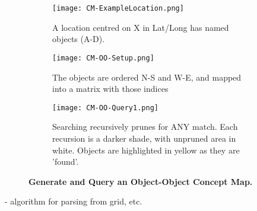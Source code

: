 \begin{figure*}[h]
    \centering
    
    \begin{subfigure}[t]{.3\textwidth}
        \texttt{[image: CM-ExampleLocation.png]}
        \caption{\small A location centred on X in Lat/Long has named objects (A-D).} %
        \label{fig:CM-Example}
    \end{subfigure}
    \hfill
    \begin{subfigure}[t]{.3\textwidth}
        \texttt{[image: CM-OO-Setup.png]}
        \caption{\small The objects are ordered N-S and W-E, and mapped into a matrix with those indices} %
        \label{fig:CM-OO-Setup}
    \end{subfigure}
    \hfill
        \begin{subfigure}[t]{.3\textwidth}
        \texttt{[image: CM-OO-Query1.png]}
        \caption{\small Searching recursively prunes for ANY match. Each recursion is a darker shade, with unpruned area in white. Objects are highlighted in yellow as they are 'found'.}%
        \label{fig:CM-OO-Query}
    \hfill
    \end{subfigure}
    \caption{\textbf{Generate and Query an Object-Object Concept Map.}}\label{figure:ConceptMap} 
\end{figure*}
- algorithm for parsing from grid, etc.


